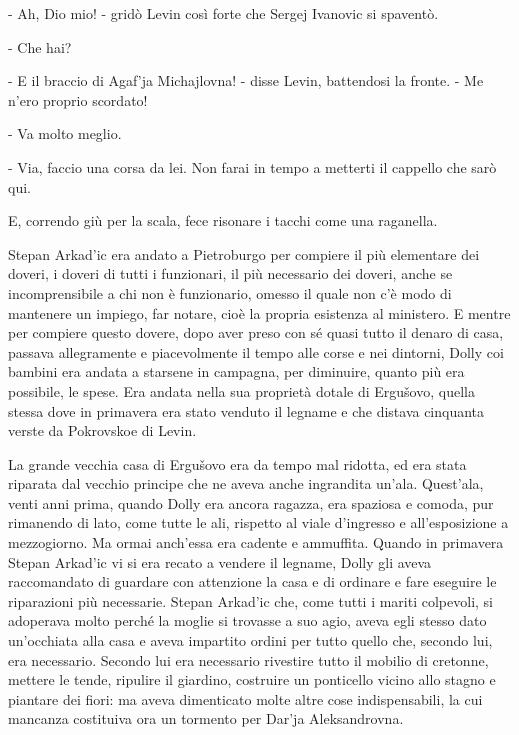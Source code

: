 - Ah, Dio mio! - gridò Levin così forte che Sergej Ivanovic si spaventò. 

- Che hai? 

- E il braccio di Agaf'ja Michajlovna! - disse Levin, battendosi la fronte. - Me n'ero proprio scordato! 

- Va molto meglio. 

- Via, faccio una corsa da lei. Non farai in tempo a metterti il cappello che sarò qui. 

E, correndo giù per la scala, fece risonare i tacchi come una raganella. 

\label{vii-2} 

Stepan Arkad'ic era andato a Pietroburgo per compiere il più elementare dei doveri, i doveri di tutti i funzionari, il più necessario dei doveri, anche se incomprensibile a chi non è funzionario, omesso il quale non c'è modo di mantenere un impiego, far notare, cioè la propria esistenza al ministero. E mentre per compiere questo dovere, dopo aver preso con sé quasi tutto il denaro di casa, passava allegramente e piacevolmente il tempo alle corse e nei dintorni, Dolly coi bambini era andata a starsene in campagna, per diminuire, quanto più era possibile, le spese. Era andata nella sua proprietà dotale di Ergušovo, quella stessa dove in primavera era stato venduto il legname e che distava cinquanta verste da Pokrovskoe di Levin. 

La grande vecchia casa di Ergušovo era da tempo mal ridotta, ed era stata riparata dal vecchio principe che ne aveva anche ingrandita un'ala. Quest'ala, venti anni prima, quando Dolly era ancora ragazza, era spaziosa e comoda, pur rimanendo di lato, come tutte le ali, rispetto al viale d'ingresso e all'esposizione a mezzogiorno. Ma ormai anch'essa era cadente e ammuffita. Quando in primavera Stepan Arkad'ic vi si era recato a vendere il legname, Dolly gli aveva raccomandato di guardare con attenzione la casa e di ordinare e fare eseguire le riparazioni più necessarie. Stepan Arkad'ic che, come tutti i mariti colpevoli, si adoperava molto perché la moglie si trovasse a suo agio, aveva egli stesso dato un'occhiata alla casa e aveva impartito ordini per tutto quello che, secondo lui, era necessario. Secondo lui era necessario rivestire tutto il mobilio di cretonne, mettere le tende, ripulire il giardino, costruire un ponticello vicino allo stagno e piantare dei fiori: ma aveva dimenticato molte altre cose indispensabili, la cui mancanza costituiva ora un tormento per Dar'ja Aleksandrovna. 

